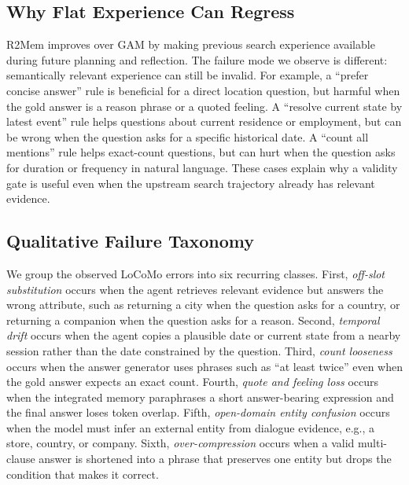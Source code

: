 \documentclass[conference]{IEEEtran}
\begin{document}
\subsection{Why Flat Experience Can Regress}
R2Mem improves over GAM by making previous search experience available during
future planning and reflection. The failure mode we observe is different:
semantically relevant experience can still be invalid. For example, a
``prefer concise answer'' rule is beneficial for a direct location question,
but harmful when the gold answer is a reason phrase or a quoted feeling. A
``resolve current state by latest event'' rule helps questions about current
residence or employment, but can be wrong when the question asks for a
specific historical date. A ``count all mentions'' rule helps exact-count
questions, but can hurt when the question asks for duration or frequency in
natural language. These cases explain why a validity gate is useful even when
the upstream search trajectory already has relevant evidence.

\subsection{Qualitative Failure Taxonomy}
We group the observed LoCoMo errors into six recurring classes. First,
\emph{off-slot substitution} occurs when the agent retrieves relevant evidence
but answers the wrong attribute, such as returning a city when the question
asks for a country, or returning a companion when the question asks for a
reason. Second, \emph{temporal drift} occurs when the agent copies a plausible
date or current state from a nearby session rather than the date constrained by
the question. Third, \emph{count looseness} occurs when the answer generator
uses phrases such as ``at least twice'' even when the gold answer expects an
exact count. Fourth, \emph{quote and feeling loss} occurs when the integrated
memory paraphrases a short answer-bearing expression and the final answer
loses token overlap. Fifth, \emph{open-domain entity confusion} occurs when
the model must infer an external entity from dialogue evidence, e.g., a store,
country, or company. Sixth, \emph{over-compression} occurs when a valid
multi-clause answer is shortened into a phrase that preserves one entity but
drops the condition that makes it correct.
\end{document}
